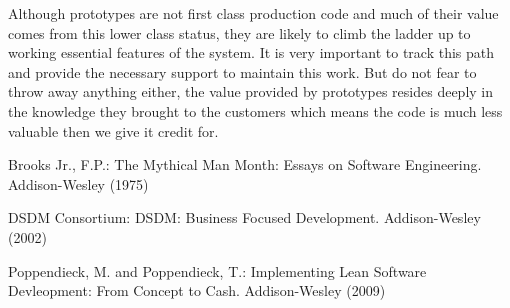 \documentclass[lnbip]{svmultln}
\begin{document}
Although prototypes are not first class production code and much of
their value comes from this lower class status, they are likely to
climb the ladder up to working essential features of the system. It
is very important to track this path and provide the necessary support
to maintain this work. But do not fear to throw away anything either,
the value provided by prototypes resides deeply in the knowledge they
brought to the customers which means the code is much less valuable
then we give it credit for.

%
%
\begin{thebibliography}{5}

 Brooks Jr., F.P.: The Mythical Man Month: Essays
  on Software Engineering. Addison-Wesley (1975)

 DSDM Consortium: DSDM: Business Focused
  Development. Addison-Wesley (2002)




 Poppendieck, M. and Poppendieck, T.:
  Implementing Lean Software Devleopment: From Concept to
  Cash. Addison-Wesley (2009)

\end{thebibliography}
%
\end{document}
